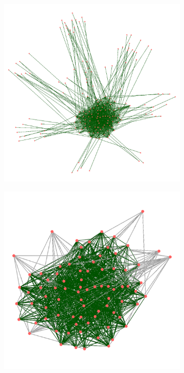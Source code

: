 \begin{figure}
\begin{subfigure}{0.31\textwidth}
		\includegraphics[width=\linewidth]{img/ExpectedNodes/LF/E2_bis.png}
		\caption{}
		\label{fig:LFR_ExempleE2}
	\end{subfigure}
	\begin{subfigure}{0.31\textwidth}
		\includegraphics[width=\linewidth]{img/ExpectedNodes/LF/Ahn.png}
		\caption{}
		\label{fig:LFR_ExempleLC}	
	\end{subfigure}


\end{figure}
